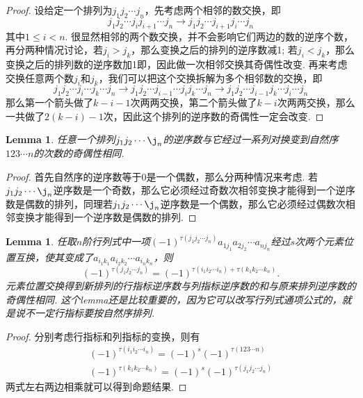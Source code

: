 \documentclass{article}
\newtheorem{lemma}[theorem]{Lemma}
\begin{document}
\begin{proof}
设给定一个排列为$j_1j_2\cdots j_n$，先考虑两个相邻的数交换，即
$$
j_1j_2\cdots j_{i}j_{i+1}\cdots j_n \longrightarrow j_1j_2\cdots j_{i+1}j_{i}\cdots j_n
$$
其中$1\leq i <n$. 很显然相邻的两个数交换，并不会影响它们两边的数的逆序个数，再分两种情况讨论，若$j_i > j_k$，那么变换之后的排列的逆序数减1; 若$j_i < j_k$，那么变换之后的排列数的逆序数加1即，因此做一次相邻交换其奇偶性改变. 再来考虑交换任意两个数$j_i$和$j_k$，我们可以把这个交换拆解为多个相邻数的交换，即
$$
j_1j_2\cdots j_{i}\cdots j_{k}\cdots j_n \longrightarrow j_1j_2\cdots j_{i-1}\cdots j_{i}j_{k}\cdots j_n \longrightarrow j_1j_2\cdots j_{i-1}j_k\cdots j_{i}\cdots j_n
$$
那么第一个箭头做了$k-i-1$次两两交换，第二个箭头做了$k-i$次两两交换，那么一共做了$2(k-i)-1$次，因此这个排列的逆序数的奇偶性一定会改变.
\end{proof}

\begin{lemma}\label{det: nixu2}
\rm 任意一个排列$j_1j_2\cdots\j_n$的逆序数与它经过一系列对换变到自然序$123\cdots n$的次数的奇偶性相同.
\end{lemma}

\begin{proof}
首先自然序的逆序数等于0是一个偶数，那么分两种情况来考虑. 若$j_1j_2\cdots\j_n$逆序数是一个奇数，那么它必须经过奇数次相邻变换才能得到一个逆序数是偶数的排列，同理若$j_1j_2\cdots\j_n$逆序数是一个偶数，那么它必须经过偶数次相邻变换才能得到一个逆序数是偶数的排列.
\end{proof}


\begin{lemma}\label{det: nixu3}
\rm 任取$n$阶行列式中一项$(-1)^{\tau(j_1j_2\cdots j_n)}a_{1j_1}a_{2j_2}\cdots a_{nj_n}$经过$s$次两个元素位置互换，使其变成了$a_{i_1k_1}a_{i_2k_2}\cdots a_{i_nk_n}$，则
$$
(-1)^{\tau(j_1j_2\cdots j_n)} = (-1)^{\tau(i_1i_2\cdots i_n)+\tau(k_1k_2\cdots k_n)}.
$$
{\color{blue} 元素位置交换得到新排列的行指标逆序数与列指标逆序数的和与原来排列逆序数的奇偶性相同}. {\color{red} 这个lemma还是比较重要的，因为它可以改写行列式通项公式的，就是说不一定行指标要按自然序排列}.
\end{lemma}

\begin{proof}
分别考虑行指标和列指标的变换，则有
$$
\begin{array}{ll}
(-1)^{\tau(i_1i_2\cdots i_n)} = (-1)^s (-1)^{\tau(123\cdots n)} \\
(-1)^{\tau(k_1k_2\cdots k_n)} = (-1)^s (-1)^{\tau(j_1j_2\cdots j_n)}
\end{array}
$$
两式左右两边相乘就可以得到命题结果.
\end{proof}
\end{document}
